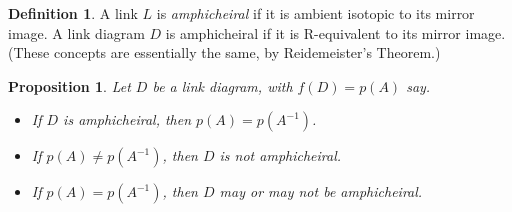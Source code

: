\documentclass[reqno]{amsart}
\newtheorem{proposition}[theorem]{Proposition}
\theoremstyle{definition}
\newtheorem{definition}[theorem]{Definition}
\begin{document}
\begin{definition}
 A link $L$ is \emph{amphicheiral} if it is ambient isotopic to its
 mirror image.  A link diagram $D$ is amphicheiral if it is
 R-equivalent to its mirror image.  (These concepts are essentially
 the same, by Reidemeister's Theorem.)
\end{definition}

\begin{proposition}\label{prop-amphicheiral}
 Let $D$ be a link diagram, with $f(D)=p(A)$ say.
 \begin{itemize}
  \item[(a)] If $D$ is amphicheiral, then $p(A)=p(A^{-1})$.
  \item[(b)] If $p(A)\neq p(A^{-1})$, then $D$ is not amphicheiral.
  \item[(c)] If $p(A)=p(A^{-1})$, then $D$ may or may not be
   amphicheiral. 
 \end{itemize}
\end{proposition}
\end{document}
